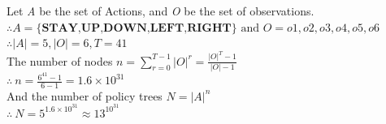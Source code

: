 \documentclass[12pt]{report}
\theoremstyle{definition}
\theoremstyle{plain}
\begin{document}
Let \emph{A} be the set of Actions, and \emph{O} be the set of observations. \\
$\therefore A=\{\textbf{STAY,UP,DOWN,LEFT,RIGHT}\} \text{ and } O={o1,o2,o3,o4,o5,o6}$ \\
$\therefore |A|=5,|O|=6,T=41$ \\

The number of nodes $n=\sum\limits_{r=0}^{T-1}|O|^r=\frac{|O|^T-1}{|O|-1}$ \\
$\therefore\ n=\frac{6^{41}-1}{6-1}=1.6\times10^{31}$ \\
And the number of policy trees $N=|A|^n$ \\
$\therefore\ N=5^{1.6\times10^{31}}\approx13^{10^{31}}$
\vspace{0.2cm} \\ \hline
\end{document}
